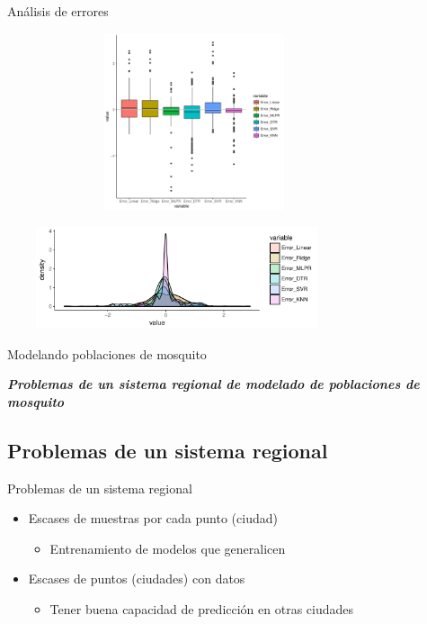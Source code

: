 \documentclass[10pt]{beamer}
\newcommand\IncrFont{\fontsize{20}{20}\selectfont}
\begin{document}
\begin{frame}
  \begin{center}
    Análisis de errores
  \end{center}
  \begin{center}
    \includegraphics[width=11cm,height=5.2cm]{boxplot_error}
  \end{center}
  \begin{center}
    \includegraphics[width=10cm,height=3cm]{histogram_error}

  \end{center}

\end{frame}

\begin{frame}{Modelando poblaciones de mosquito}
  \IncrFont
  \begin{center}
    \textit{\textbf{Problemas de un sistema regional de modelado de poblaciones de mosquito}}
  \end{center}
\end{frame}



\subsection{Problemas de un sistema regional}


\begin{frame}{Problemas de un sistema regional}
  \begin{itemize}[<+->]
    \item Escases de muestras por cada punto (ciudad)
    \begin{itemize}
      \item Entrenamiento de modelos que generalicen
    \end{itemize}
    \item Escases de puntos (ciudades) con datos
    \begin{itemize}
      \item Tener buena capacidad de predicción en otras ciudades
    \end{itemize}

  \end{itemize}
\end{frame}
\end{document}
